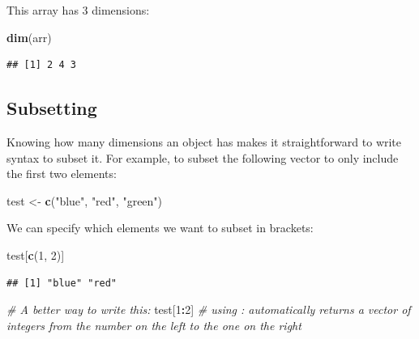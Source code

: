 \documentclass[
]{book}
\newenvironment{Shaded}{\begin{snugshade}}{\end{snugshade}}
\newcommand{\CommentTok}[1]{\textcolor[rgb]{0.56,0.35,0.01}{\textit{#1}}}
\newcommand{\DecValTok}[1]{\textcolor[rgb]{0.00,0.00,0.81}{#1}}
\newcommand{\FunctionTok}[1]{\textcolor[rgb]{0.13,0.29,0.53}{\textbf{#1}}}
\newcommand{\NormalTok}[1]{#1}
\newcommand{\OtherTok}[1]{\textcolor[rgb]{0.56,0.35,0.01}{#1}}
\newcommand{\SpecialCharTok}[1]{\textcolor[rgb]{0.81,0.36,0.00}{\textbf{#1}}}
\newcommand{\StringTok}[1]{\textcolor[rgb]{0.31,0.60,0.02}{#1}}
\begin{document}
This array has 3 dimensions:

\begin{Shaded}
\begin{Highlighting}[]
\FunctionTok{dim}\NormalTok{(arr)}
\end{Highlighting}
\end{Shaded}

\begin{verbatim}
## [1] 2 4 3
\end{verbatim}

\hypertarget{subsetting}{%
\subsection{Subsetting}\label{subsetting}}

Knowing how many dimensions an object has makes it straightforward to write
syntax to subset it. For example, to subset the following vector to only include
the first two elements:

\begin{Shaded}
\begin{Highlighting}[]
\NormalTok{test }\OtherTok{\textless{}{-}} \FunctionTok{c}\NormalTok{(}\StringTok{"blue"}\NormalTok{, }\StringTok{"red"}\NormalTok{, }\StringTok{"green"}\NormalTok{)}
\end{Highlighting}
\end{Shaded}

We can specify which elements we want to subset in brackets:

\begin{Shaded}
\begin{Highlighting}[]
\NormalTok{test[}\FunctionTok{c}\NormalTok{(}\DecValTok{1}\NormalTok{, }\DecValTok{2}\NormalTok{)]}
\end{Highlighting}
\end{Shaded}

\begin{verbatim}
## [1] "blue" "red"
\end{verbatim}

\begin{Shaded}
\begin{Highlighting}[]
\CommentTok{\# A better way to write this:}
\NormalTok{test[}\DecValTok{1}\SpecialCharTok{:}\DecValTok{2}\NormalTok{] }\CommentTok{\# using : automatically returns a vector of integers from the number on the left to the one on the right}
\end{Highlighting}
\end{Shaded}
\end{document}
